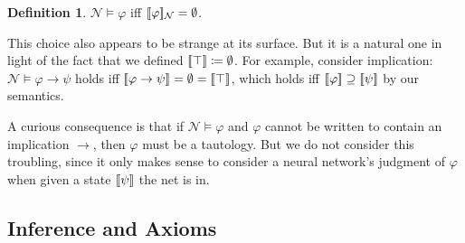\documentclass[letterpaper]{article}
\theoremstyle{definition}
\newtheorem{definition}{Definition}
\newcommand{\semantics}[1]{[\![\mbox{\em $ #1 $\/}]\!]}
\newcommand{\Net}{\mathcal{N}}
\begin{document}
\begin{definition}
$\Net \models \varphi$ iff $\semantics{\varphi}_\Net = \emptyset$.
\end{definition}

This choice also appears to be strange at its surface.  But it is a natural one in light of the fact that we defined $\semantics{\top} \coloneqq \emptyset$.  For example, consider implication: $\Net \models \varphi \to \psi$ holds iff $\semantics{\varphi \to \psi} = \emptyset = \semantics{\top}$, which holds iff $\semantics{\varphi} \supseteq \semantics{\psi}$ by our semantics.

A curious consequence is that if $\Net \models \varphi$ and $\varphi$ cannot be written to contain an implication $\to$, then $\varphi$ must be a tautology.  But we do not consider this troubling, since it only makes sense to consider a neural network's judgment of $\varphi$ when given a state $\semantics{\psi}$ the net is in.


\subsection{Inference and Axioms}
\end{document}
